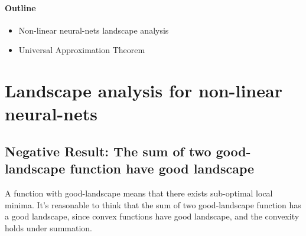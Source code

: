 \paragraph{Outline}
\begin{itemize}
\item
Non-linear neural-nets landscape analysis
\item
Universal Approximation Theorem
\end{itemize}


\section{
Landscape analysis for non-linear neural-nets
}
\subsection{Negative Result: 
The sum of two good-landscape function have good landscape
}
A function with good-landscape means that there exists sub-optimal local minima.
It's reasonable to think that the sum of two good-landscape function has a good landscape, since convex functions have good landscape, and the convexity holds under summation.

